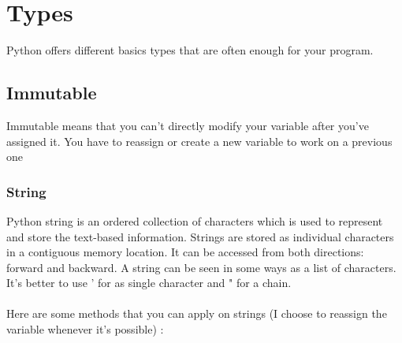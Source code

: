 \documentclass[a4paper, 12pt, titlepage]{scrartcl} %
\begin{document}
\clearpage
\section{Types}
Python offers different basics types that are often enough for your program.\newline

\subsection{Immutable}
Immutable means that you can't directly modify your variable after you've assigned it. You have to reassign or create a new variable to work on a previous one\newline

\subsubsection{String}
Python string is an ordered collection of characters which is used to represent and store the text-based information. Strings are stored as individual characters in a contiguous memory location. It can be accessed from both directions: forward and backward. A string can be seen in some ways as a list of characters. \\It's better to use ' for as single character and " for a chain. \\ \\
Here are some methods that you can apply on strings (I choose to reassign the variable whenever it's possible) : 
\end{document}
